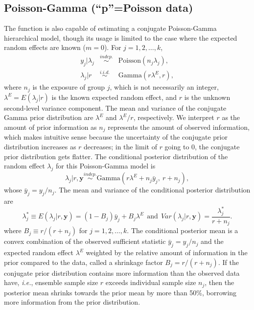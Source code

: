 \documentclass[article]{jss}
\begin{document}
\subsection[Poisson-Gamma]{Poisson-Gamma (``p''=Poisson data)}\label{poissonsubsec}
The function  is also capable of estimating a conjugate Poisson-Gamma hierarchical model, though its usage is limited to the case where the expected random effects are known ($m=0$).  For $j=1, 2, \ldots, k$, 
\begin{eqnarray}
y_j\vert \lambda_j &\stackrel{indep.}{\sim} & \textrm{Poisson}(n_{j}\lambda_{j}),\\
\lambda_{j}\vert r &\stackrel{i.i.d.}{\sim}& \textrm{Gamma}(r\lambda^E, r),
\end{eqnarray}
where $n_{j}$ is the exposure of group $j$, which is not necessarily an integer, $\lambda^E=E(\lambda_j\vert r)$ is the known expected random effect, and $r$ is the unknown second-level variance component. The mean and variance of the conjugate Gamma prior distribution are $\lambda^E$ and $\lambda^E/r$, respectively. We interpret $r$ as the amount of prior information as $n_{j}$ represents the amount of observed information, which makes intuitive sense because the uncertainty of the conjugate prior distribution increases as $r$ decreases; in the limit of $r$ going to 0, the conjugate prior distribution gets flatter. The conditional posterior distribution of the random effect $\lambda_j$ for this Poisson-Gamma model is
\begin{equation} \label{gammapost}
\lambda_j\vert r, \boldsymbol{y} \stackrel{indep.}{\sim}\textrm{Gamma}(r\lambda^E + n_j\bar{y}_{j},~ r + n_j),
\end{equation}  
whose $\bar{y}_j=y_j/n_j$. The mean and variance of the conditional posterior distribution are
\begin{equation}\label{gammapost_mean_var}
\lambda^\ast_j\equiv E(\lambda_j\vert r, \boldsymbol{y} )=(1-B_{j})\bar{y}_{j} + B_{j}\lambda^E~~\textrm{and}~~Var(\lambda_j\vert r, \boldsymbol{y})=\frac{\lambda^\ast_j}{r+n_j}.
\end{equation}
where $B_{j}\equiv r / (r+n_{j})$ for $j=1, 2, \ldots, k$.  The conditional posterior mean is  a convex combination of the observed sufficient statistic $\bar{y}_{j} = y_j/n_j$ and the expected random effect  $\lambda^E$ weighted by the relative amount of information in the prior compared to the data, called a shrinkage factor $B_j=r / (r + n_j)$. If the conjugate prior distribution contains more information than the observed data have, \emph{i.e.}, ensemble sample size $r$ exceeds individual sample size $n_{j}$, then the posterior mean shrinks  towards the prior mean by more than 50\%, borrowing more information from the prior distribution. 
\end{document}
